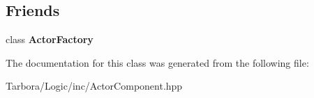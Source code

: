 \subsection*{Friends}
\begin{DoxyCompactItemize}
\item 
\mbox{\label{classTarbora_1_1ActorComponent_a6ab97c7737ba5ca6e4cb3a4621c48421}} 
class {\bfseries Actor\+Factory}
\end{DoxyCompactItemize}


The documentation for this class was generated from the following file\+:\begin{DoxyCompactItemize}
\item 
Tarbora/\+Logic/inc/Actor\+Component.\+hpp\end{DoxyCompactItemize}
